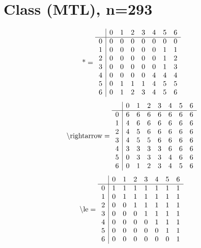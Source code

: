\documentclass[11pt]{article}
\begin{document}
\section{Class (MTL), n=293}
\[\text{*} = 
\begin{array}{r | r r r r r r r}
 & 0 & 1 & 2 & 3 & 4 & 5 & 6 \\ \hline
0 & 0 & 0 & 0 & 0 & 0 & 0 & 0 \\
1 & 0 & 0 & 0 & 0 & 0 & 1 & 1 \\
2 & 0 & 0 & 0 & 0 & 0 & 1 & 2 \\
3 & 0 & 0 & 0 & 0 & 0 & 1 & 3 \\
4 & 0 & 0 & 0 & 0 & 4 & 4 & 4 \\
5 & 0 & 1 & 1 & 1 & 4 & 5 & 5 \\
6 & 0 & 1 & 2 & 3 & 4 & 5 & 6 \\
\end{array}
\]
\[\text{\textbackslash rightarrow} = 
\begin{array}{r | r r r r r r r}
 & 0 & 1 & 2 & 3 & 4 & 5 & 6 \\ \hline
0 & 6 & 6 & 6 & 6 & 6 & 6 & 6 \\
1 & 4 & 6 & 6 & 6 & 6 & 6 & 6 \\
2 & 4 & 5 & 6 & 6 & 6 & 6 & 6 \\
3 & 4 & 5 & 5 & 6 & 6 & 6 & 6 \\
4 & 3 & 3 & 3 & 3 & 6 & 6 & 6 \\
5 & 0 & 3 & 3 & 3 & 4 & 6 & 6 \\
6 & 0 & 1 & 2 & 3 & 4 & 5 & 6 \\
\end{array}
\]
\[\text{\textbackslash le} = 
\begin{array}{r | r r r r r r r}
 & 0 & 1 & 2 & 3 & 4 & 5 & 6 \\ \hline
0 & 1 & 1 & 1 & 1 & 1 & 1 & 1 \\
1 & 0 & 1 & 1 & 1 & 1 & 1 & 1 \\
2 & 0 & 0 & 1 & 1 & 1 & 1 & 1 \\
3 & 0 & 0 & 0 & 1 & 1 & 1 & 1 \\
4 & 0 & 0 & 0 & 0 & 1 & 1 & 1 \\
5 & 0 & 0 & 0 & 0 & 0 & 1 & 1 \\
6 & 0 & 0 & 0 & 0 & 0 & 0 & 1 \\
\end{array}
\]
\end{document}

